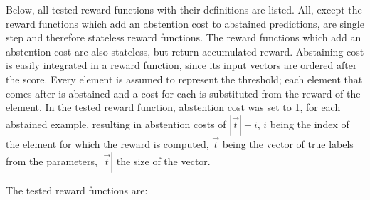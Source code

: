 \documentclass[twoside,11pt]{article}
\begin{document}
Below, all tested reward functions with their definitions
are listed.
All, except the reward functions
which add an abstention cost to abstained predictions,
are single step and therefore stateless reward functions.
The reward functions which add an abstention cost are
also stateless, but return accumulated reward.
Abstaining cost is easily integrated in a reward function,
since its input vectors are ordered after the score.
Every element is assumed to represent the threshold; each
element that comes after is abstained and a cost for each
is substituted from the reward of the element.
In the tested reward function, abstention cost was set to
1, for each abstained example, resulting in abstention
costs of $|\vec{t}| - i$, $i$ being the index of the
element for which the reward is computed, $\vec{t}$ being
the vector of true labels from the parameters, $|\vec{t}|$
the size of the vector.

The tested reward functions are:
\end{document}
